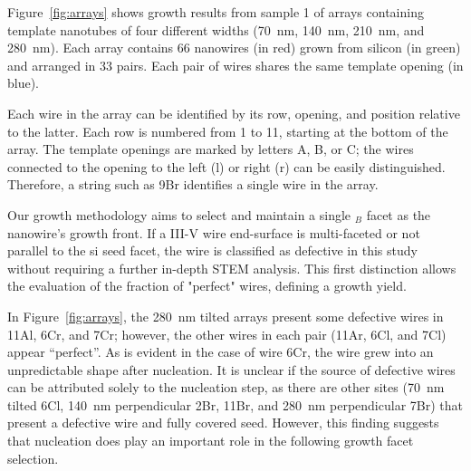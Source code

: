 Figure~\ref{fig:arrays} shows growth results from sample 1 of arrays containing template nanotubes of four different widths (\qty{70}{nm}, \qty{140}{nm}, \qty{210}{nm}, and \qty{280}{nm}). Each array contains 66 nanowires (in red) grown from silicon (in green) and arranged in 33 pairs. Each pair of wires shares the same template opening (in blue). 
\par
Each wire in the array can be identified by its row, opening, and position relative to the latter. Each row is numbered from 1 to 11, starting at the bottom of the array. The template openings are marked by letters A, B, or C; the wires connected to the opening to the left (l) or right (r) can be easily distinguished. Therefore, a string such as 9Br identifies a single wire in the array. 
\par
Our growth methodology aims to select and maintain a single \(_B\) facet as the nanowire's growth front. If a III-V wire end-surface is multi-faceted or not parallel to the \acs{si} seed facet, the wire is classified as defective in this study without requiring a further in-depth STEM analysis. This first distinction allows the evaluation of the fraction of "perfect" wires, defining a growth yield. 
\par
In Figure~\ref{fig:arrays}, the \qty{280}{nm} tilted arrays present some defective wires in 11Al, 6Cr, and 7Cr; however, the other wires in each pair (11Ar, 6Cl, and 7Cl) appear “perfect”. As is evident in the case of wire 6Cr, the wire grew into an unpredictable shape after nucleation. It is unclear if the source of defective wires can be attributed solely to the nucleation step, as there are other sites (\qty{70}{nm} tilted 6Cl, \qty{140}{nm} perpendicular 2Br, 11Br, and \qty{280}{nm} perpendicular 7Br) that present a defective wire and fully covered seed. However, this finding suggests that nucleation does play an important role in the following growth facet selection.


